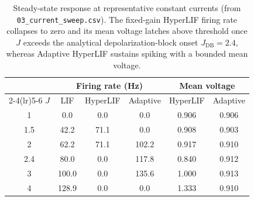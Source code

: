 \begin{table}[t]
\centering
\caption{Steady-state response at representative constant currents (from \texttt{03\_current\_sweep.csv}). The fixed-gain HyperLIF firing rate collapses to zero and its mean voltage latches above threshold once $J$ exceeds the analytical depolarization-block onset $J_{\mathrm{DB}}=2.4$, whereas Adaptive HyperLIF sustains spiking with a bounded mean voltage.}
\label{tab:sweep}
\begin{tabular}{cccccc}
\toprule
& \multicolumn{3}{c}{Firing rate (Hz)} & \multicolumn{2}{c}{Mean voltage} \\
\cmidrule(lr){2-4}\cmidrule(lr){5-6}
$J$ & LIF & HyperLIF & Adaptive & HyperLIF & Adaptive \\
\midrule
1 & 0.0 & 0.0 & 0.0 & 0.906 & 0.906 \\
1.5 & 42.2 & 71.1 & 0.0 & 0.908 & 0.903 \\
2 & 62.2 & 71.1 & 102.2 & 0.917 & 0.910 \\
2.4 & 80.0 & 0.0 & 117.8 & 0.840 & 0.912 \\
3 & 100.0 & 0.0 & 135.6 & 1.000 & 0.913 \\
4 & 128.9 & 0.0 & 0.0 & 1.333 & 0.910 \\
\bottomrule
\end{tabular}
\end{table}
